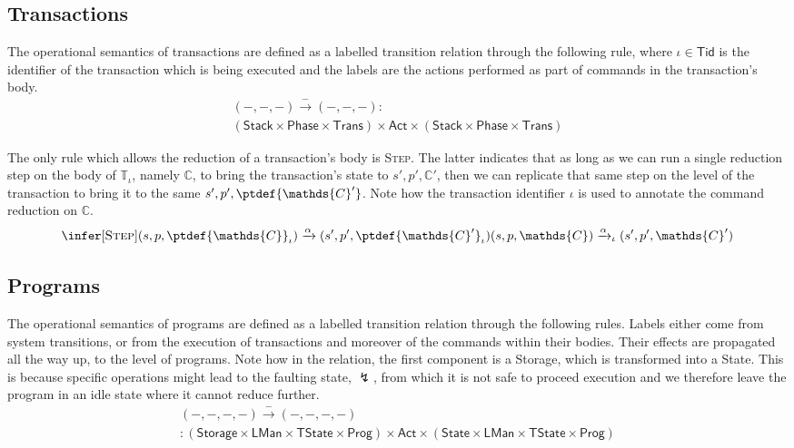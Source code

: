 \tocless\subsection{Transactions}

The operational semantics of transactions are defined as a labelled transition relation through the following rule, where $\iota \in \mathsf{Tid}$ is the identifier of the transaction which is being executed and the labels are the actions performed as part of commands in the transaction's body.
\begin{gather*}
	(-, -, -) \xrightarrow{-} (-, -, -) : \\
	\left( \mathsf{Stack} \times \mathsf{Phase} \times \mathsf{Trans} \right)
	\times \mathsf{Act} \times
	\left( \mathsf{Stack} \times \mathsf{Phase} \times \mathsf{Trans} \right)
\end{gather*}

The only rule which allows the reduction of a transaction's body is \textsc{Step}. The latter indicates that as long as we can run a single reduction step on the body of $\mathds{T}_\iota$, namely $\mathds{C}$, to bring the transaction's state to $s', p', \mathds{C}'$, then we can replicate that same step on the level of the transaction to bring it to the same $s', p', \ptdef{\mathds{C}'}$. Note how the transaction identifier $\iota$ is used to annotate the command reduction on $\mathds{C}$.
\[
\infer[\textsc{Step}]
{
	(s, p, \ptdef{\mathds{C}}_\iota)
	\xrightarrow{\alpha}
	(s', p', \ptdef{\mathds{C}'}_\iota)
}
{
	(s, p, \mathds{C})
	\xrightarrow{\alpha}_\iota
	(s', p', \mathds{C}')
}
\]

\tocless\subsection{Programs}

The operational semantics of programs are defined as a labelled transition relation through the following rules. Labels either come from system transitions, or from the execution of transactions and moreover of the commands within their bodies. Their effects are propagated all the way up, to the level of programs. Note how in the relation, the first component is a \textsf{Storage}, which is transformed into a \textsf{State}. This is because specific operations might lead to the faulting state, $\lightning$, from which it is not safe to proceed execution and we therefore leave the program in an idle state where it cannot reduce further.
\begin{gather*}
(-, -, -, -) \xrightarrow{-} (-, -, -, -) \\
:
\left( \mathsf{Storage} \times \mathsf{LMan} \times \mathsf{TState} \times \mathsf{Prog} \right)
\times \mathsf{Act} \times
\left( \mathsf{State} \times \mathsf{LMan} \times \mathsf{TState} \times \mathsf{Prog} \right)
\end{gather*}

